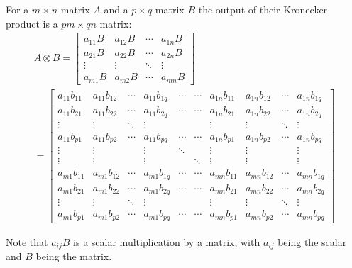 For a $m \times n$ matrix  $A$ and a $p \times q$ matrix  $B$ the output of their Kronecker product is a $pm \times qn$ matrix:
\begin{multline*}
A \otimes B = \begin{bmatrix}
	a_{11} B & a_{12} B & \cdots & a_{1n}B \\
	a_{21} B & a_{22} B & \cdots & a_{2n}B \\
	\vdots & \vdots & \ddots &           \vdots \\
	a_{m1} B & a_{m2} B & \cdots & a_{mn} B
\end{bmatrix} \\
= \begin{bmatrix}
a_{11} b_{11} & a_{11} b_{12} & \cdots & a_{11} b_{1q} &
\cdots & \cdots & a_{1n} b_{11} & a_{1n} b_{12} & \cdots & a_{1n} b_{1q} \\
a_{11} b_{21} & a_{11} b_{22} & \cdots & a_{11} b_{2q} &
\cdots & \cdots & a_{1n} b_{21} & a_{1n} b_{22} & \cdots & a_{1n} b_{2q} \\
\vdots & \vdots & \ddots & \vdots & & & \vdots & \vdots & \ddots & \vdots \\
a_{11} b_{p1} & a_{11} b_{p2} & \cdots & a_{11} b_{pq} &
\cdots & \cdots & a_{1n} b_{p1} & a_{1n} b_{p2} & \cdots & a_{1n} b_{pq} \\
\vdots & \vdots & & \vdots & \ddots & & \vdots & \vdots & & \vdots \\
\vdots & \vdots & & \vdots & & \ddots & \vdots & \vdots & & \vdots \\
a_{m1} b_{11} & a_{m1} b_{12} & \cdots & a_{m1} b_{1q} &
\cdots & \cdots & a_{mn} b_{11} & a_{mn} b_{12} & \cdots & a_{mn} b_{1q} \\
a_{m1} b_{21} & a_{m1} b_{22} & \cdots & a_{m1} b_{2q} &
\cdots & \cdots & a_{mn} b_{21} & a_{mn} b_{22} & \cdots & a_{mn} b_{2q} \\
\vdots & \vdots & \ddots & \vdots & & & \vdots & \vdots & \ddots & \vdots \\
a_{m1} b_{p1} & a_{m1} b_{p2} & \cdots & a_{m1} b_{pq} &
\cdots & \cdots & a_{mn} b_{p1} & a_{mn} b_{p2} & \cdots & a_{mn} b_{pq}
\end{bmatrix}
\end{multline*}

Note that $a_{ij}B$ is a scalar multiplication by a matrix, with $a_{ij}$ being the scalar and $B$ being the matrix.


